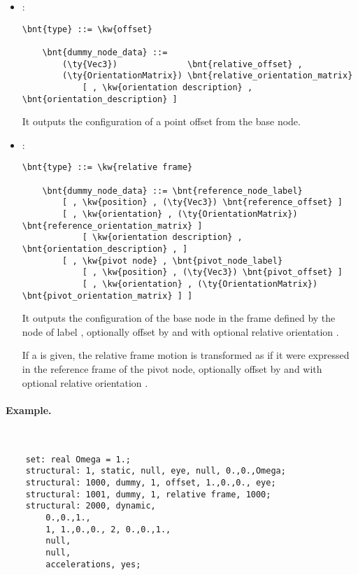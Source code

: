 \begin{itemize}
    \item {}:
\begin{Verbatim}[commandchars=\\\{\}]
    \bnt{type} ::= \kw{offset}

    \bnt{dummy_node_data} ::=
        (\ty{Vec3})              \bnt{relative_offset} ,
        (\ty{OrientationMatrix}) \bnt{relative_orientation_matrix}
            [ , \kw{orientation description} , \bnt{orientation_description} ]
\end{Verbatim}
    It outputs the configuration of a point offset from the base node.
            
    \item {}:
\begin{Verbatim}[commandchars=\\\{\}]
    \bnt{type} ::= \kw{relative frame}

    \bnt{dummy_node_data} ::= \bnt{reference_node_label}
        [ , \kw{position} , (\ty{Vec3}) \bnt{reference_offset} ]
        [ , \kw{orientation} , (\ty{OrientationMatrix}) \bnt{reference_orientation_matrix} ]
            [ \kw{orientation description} , \bnt{orientation_description} , ]
        [ , \kw{pivot node} , \bnt{pivot_node_label}
            [ , \kw{position} , (\ty{Vec3}) \bnt{pivot_offset} ]
            [ , \kw{orientation} , (\ty{OrientationMatrix}) \bnt{pivot_orientation_matrix} ] ]
\end{Verbatim}
    It outputs the configuration of the base node in the frame defined
    by the node of label , optionally offset 
    by  and with optional relative orientation 
    .

    If a  is given, the relative frame motion
    is transformed as if it were expressed in the reference frame
    of the pivot node, optionally offset by 
    and with optional relative orientation .
\end{itemize}

\paragraph{Example.} \
\begin{verbatim}
    set: real Omega = 1.;
    structural: 1, static, null, eye, null, 0.,0.,Omega;
    structural: 1000, dummy, 1, offset, 1.,0.,0., eye;
    structural: 1001, dummy, 1, relative frame, 1000;
    structural: 2000, dynamic,
        0.,0.,1.,
        1, 1.,0.,0., 2, 0.,0.,1.,
        null,
        null,
        accelerations, yes;
\end{verbatim}

